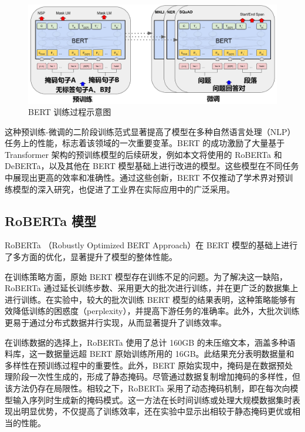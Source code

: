 \begin{figure}[htb]
	\centering
	\includegraphics[width=0.9\linewidth]{figures/BERT_Overall.jpg}
	\caption{BERT 训练过程示意图 \cite{devlin_bert_2019}}
	\label{fig:BERT-OverAll}
\end{figure}

这种预训练-微调的二阶段训练范式显著提高了模型在多种自然语言处理（NLP）任务上的性能，标志着该领域的一次重要变革。BERT 的成功激励了大量基于 Transformer 架构的预训练模型的后续研发，例如本文将使用的 RoBERTa 和 DeBERTa，以及其他在 BERT 模型基础上进行改进的模型。这些模型在不同任务中展现出更高的效率和准确性。通过这些创新，BERT 不仅推动了学术界对预训练模型的深入研究，也促进了工业界在实际应用中的广泛采用。

\subsection{RoBERTa 模型}
\label{sec:method-pretrain-roberta}

RoBERTa \cite{liu_roberta_2019}（Robustly Optimized BERT Approach）在 BERT \cite{devlin_bert_2019} 模型的基础上进行了多方面的优化，显著提升了模型的整体性能。

在训练策略方面，原始 BERT 模型存在训练不足的问题。为了解决这一缺陷，RoBERTa 通过延长训练步数、采用更大的批次进行训练，并在更广泛的数据集上进行训练。在实验中，较大的批次训练 BERT 模型的结果表明，这种策略能够有效降低训练的困惑度（perplexity），并提高下游任务的准确率。此外，大批次训练更易于通过分布式数据并行实现，从而显著提升了训练效率。

在训练数据的选择上，RoBERTa 使用了总计 160GB 的未压缩文本，涵盖多种语料库，这一数据量远超 BERT 原始训练所用的 16GB。此结果充分表明数据量和多样性在预训练过程中的重要性。此外，BERT 原始实现中，掩码是在数据预处理阶段一次性生成的，形成了静态掩码。尽管通过数据复制增加掩码的多样性，但该方法仍存在局限性。相较之下，RoBERTa 采用了动态掩码机制，即在每次向模型输入序列时生成新的掩码模式。这一方法在长时间训练或处理大规模数据集时表现出明显优势，不仅提高了训练效率，还在实验中显示出相较于静态掩码更优或相当的性能。

